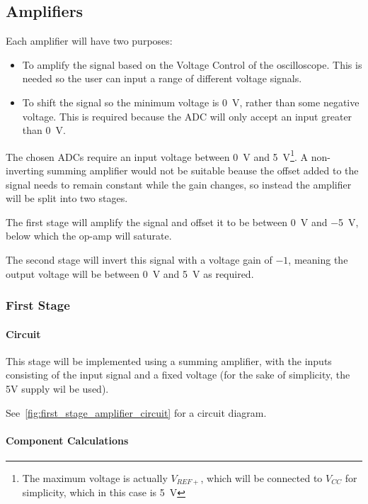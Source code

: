 \subsection{Amplifiers}

Each amplifier will have two purposes:
\begin{itemize}
  \item To amplify the signal based on the Voltage Control of the oscilloscope.
    This is needed so the user can input a range of different voltage signals.

  \item To shift the signal so the minimum voltage is \SI{0}{\volt}, rather
    than some negative voltage. This is required because the ADC will only
    accept an input greater than \SI{0}{\volt}.
\end{itemize}

The chosen ADCs require an input voltage between \SI{0}{\volt} and
\SI{5}{\volt}\footnote{The maximum voltage is actually $V_{REF+}$, which will be
connected to $V_{CC}$ for simplicity, which in this case is \SI{5}{\volt}}. A
non-inverting summing amplifier would not be suitable beause the offset added to
the signal needs to remain constant while the gain changes, so instead the
amplifier will be split into two stages.

The first stage will amplify the signal and offset it to be between
\SI{0}{\volt} and \SI{-5}{\volt}, below which the op-amp will saturate.

The second stage will invert this signal with a voltage gain of $-1$, meaning
the output voltage will be between \SI{0}{\volt} and \SI{5}{\volt} as required.

\subsubsection{First Stage}

\paragraph{Circuit}
This stage will be implemented using a summing amplifier, with the inputs
consisting of the input signal and a fixed voltage (for the sake of simplicity,
the 5V supply wil be used).

See~\cref{fig:first_stage_amplifier_circuit} for a circuit diagram.

\paragraph{Component Calculations}

